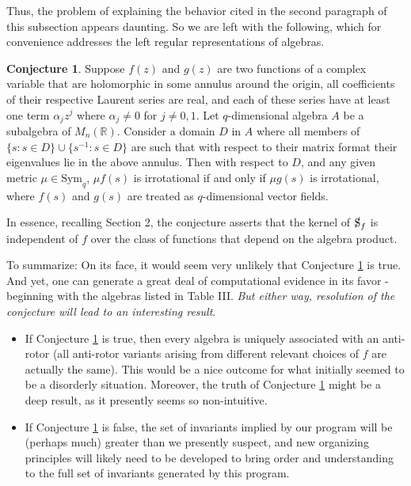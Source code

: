 \documentclass{amsart}
\theoremstyle{definition}
\newtheorem{conjecture}[theorem]{Conjecture}
\numberwithin{theorem}{section}
\numberwithin{equation}{section}
\begin{document}
Thus, the problem of explaining the behavior cited in the second paragraph of this subsection appears daunting.   So we are left with the following, which for convenience addresses the left regular representations of algebras.

\begin{conjecture} \label{9/30/25.1} Suppose $f(z)$ and $g(z)$ are two functions of a complex variable that are holomorphic in some annulus around the origin, all coefficients of their respective Laurent series are real, and each of these series have at least one term $\alpha_j z^j$ where $\alpha_j\ne 0$ for $j\ne 0,1$.  Let $q$-dimensional algebra $A$ be a subalgebra of $M_n(\mathbb{R})$.  Consider a domain $D$ in $A$ where all members of $\{s: s\in D\}\cup \{s^{-1}: s\in D\}$ are such that with respect to their matrix format their eigenvalues lie in the above annulus.   Then with respect to $D$, and any given metric $\mu\in \text{Sym}_q$, $\mu f(s)$ is irrotational if and only if $\mu g(s)$ is irrotational, where $f(s)$ and $g(s)$ are treated as $q$-dimensional vector fields. \end{conjecture}

In essence, recalling Section 2, the conjecture asserts that the kernel of $\slashed{\text{S}}_f$ is independent of $f$ over the class of functions that depend on the algebra product.

\bigskip

To summarize: On its face, it would seem very unlikely that Conjecture \ref{9/30/25.1} is true.  And yet, one can generate a great deal of computational evidence in its favor - beginning with the algebras listed in Table III.  {\it But either way, resolution of the conjecture will lead to an interesting result}.
\begin{itemize}\item If Conjecture \ref{9/30/25.1} is true, then every algebra is uniquely associated with an anti-rotor (all anti-rotor variants arising from different relevant choices of $f$ are actually the same).  This would be a nice outcome for what initially seemed to be a disorderly situation.  Moreover, the truth of Conjecture \ref{9/30/25.1} might be a deep result, as it presently seems so non-intuitive.  \item
If Conjecture \ref{9/30/25.1} is false, the set of invariants implied by our program will be (perhaps much) greater than we presently suspect, and new organizing principles will likely need to be developed to bring order and understanding to the full set of invariants generated by this program.
\end{itemize}
\end{document}
